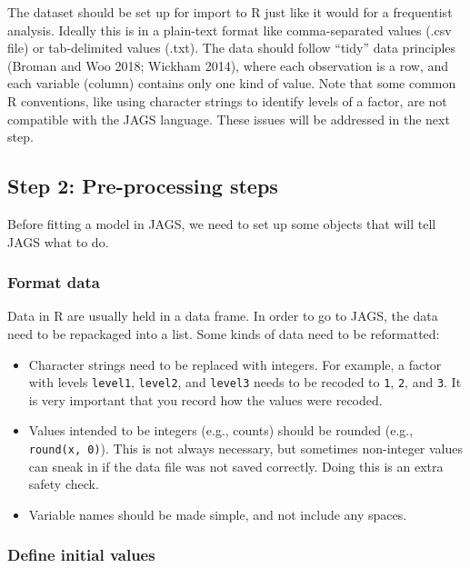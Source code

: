 \documentclass[
  13,
  letterpaper,
]{report}
\providecommand{\tightlist}{%
  \setlength{\itemsep}{0pt}\setlength{\parskip}{0pt}}
\begin{document}
The dataset should be set up for import to R just like it would for a
frequentist analysis. Ideally this is in a plain-text format like
comma-separated values (.csv file) or tab-delimited values (.txt). The
data should follow ``tidy'' data principles (Broman and Woo 2018;
Wickham 2014), where each observation is a row, and each variable
(column) contains only one kind of value. Note that some common R
conventions, like using character strings to identify levels of a
factor, are not compatible with the JAGS language. These issues will be
addressed in the next step.

\subsection{Step 2: Pre-processing
steps}\label{step-2-pre-processing-steps}

Before fitting a model in JAGS, we need to set up some objects that will
tell JAGS what to do.

\subsubsection{Format data}\label{format-data}

Data in R are usually held in a data frame. In order to go to JAGS, the
data need to be repackaged into a list. Some kinds of data need to be
reformatted:

\begin{itemize}
\tightlist
\item
  Character strings need to be replaced with integers. For example, a
  factor with levels \texttt{level1}, \texttt{level2}, and
  \texttt{level3} needs to be recoded to \texttt{1}, \texttt{2}, and
  \texttt{3}. It is very important that you record how the values were
  recoded.
\item
  Values intended to be integers (e.g., counts) should be rounded (e.g.,
  \texttt{round(x,\ 0)}). This is not always necessary, but sometimes
  non-integer values can sneak in if the data file was not saved
  correctly. Doing this is an extra safety check.
\item
  Variable names should be made simple, and not include any spaces.
\end{itemize}

\subsubsection{Define initial values}\label{define-initial-values}
\end{document}
